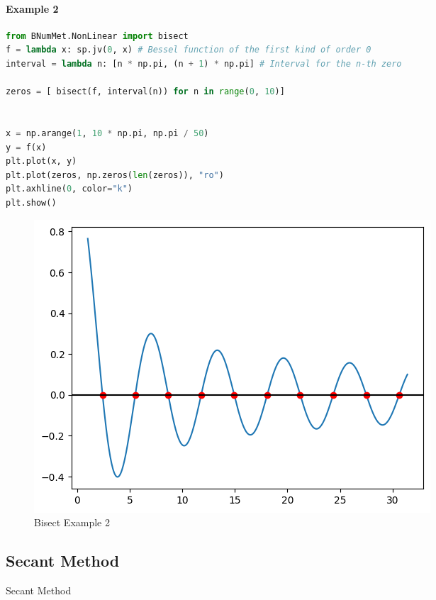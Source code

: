\paragraph{Example 2}{
\begin{lstlisting}[language=Python]
from BNumMet.NonLinear import bisect
f = lambda x: sp.jv(0, x) # Bessel function of the first kind of order 0
interval = lambda n: [n * np.pi, (n + 1) * np.pi] # Interval for the n-th zero

zeros = [ bisect(f, interval(n)) for n in range(0, 10)]


x = np.arange(1, 10 * np.pi, np.pi / 50)
y = f(x)
plt.plot(x, y)
plt.plot(zeros, np.zeros(len(zeros)), "ro")
plt.axhline(0, color="k")
plt.show()
\end{lstlisting}
\begin{figure}[H]
    \centering
    \includegraphics{Include/Images/Thesis/Documentation/NonLinear/Bisect Example 2.png}
    \caption{Bisect Example 2}
    \label{fig:Bisect Example 2}
\end{figure}
}



\subsection{Secant Method}
\begin{algorithm}[H]
\SetAlgoLined
 \caption{Secant Method}
\end{algorithm}
